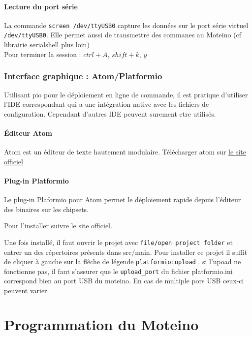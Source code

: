 \documentclass[a4paper]{report}
\begin{document}
\subsubsection{Lecture du port série}

La commande \verb+screen /dev/ttyUSB0+ capture les données sur le port série virtuel \verb+/dev/ttyUSB0+. Elle permet aussi de transmettre des commanes au Moteino (cf librairie serialshell plus loin)\\
Pour terminer la session : $ctrl+A$, $shift+k$, $y$

\subsection{Interface graphique : Atom/Platformio}

Utilisant pio pour le déploiement en ligne de commande, il est pratique d'utiliser l'IDE correspondant qui a une intégration native avec les fichiers de configuration. Cependant d'autres IDE peuvent surement etre utilisés.

\subsubsection{Éditeur Atom}

Atom est un éditeur de texte hautement modulaire.
Télécharger atom sur \href{https://atom.io/}{le site officiel}

\subsubsection{Plug-in Platformio}

Le plug-in Plaformio pour Atom permet le déploiement rapide depuis l'éditeur des binaires sur les chipsets.

Pour l'installer suivre \href{http://docs.platformio.org/en/stable/ide/atom.html#installation}{le site officiel}.

Une fois installé, il faut ouvrir le projet avec \verb+file/open project folder+ et entrer un des répertoires présents dans src/main. Pour installer ce projet il suffit de cliquer à gauche sur la flêche de légende \verb+platformio:upload+ . si l'upoad ne fonctionne pas, il faut s'assurer que le \verb+upload_port+ du fichier platformio.ini correspond bien au port USB du moteino. En cas de multiple pors USB ceux-ci peuvent varier.

\chapter{Programmation du Moteino}
\minitoc
\end{document}
